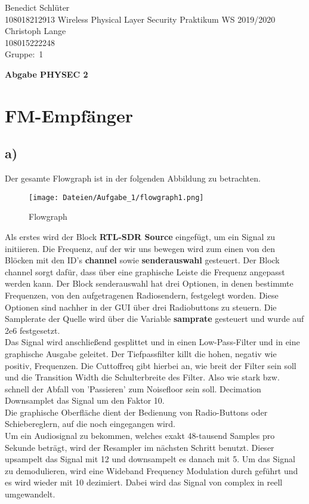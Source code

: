 \documentclass[12pt,a4paper]{article}
\newcommand{\student}{Benedict Schlüter\\ 108018212913 } %
\newcommand{\partner}{Christoph Lange\\ 108015222248} %
\newcommand{\group}{1} %
\newcommand{\hwheadtwo}{$ $
  \vspace{-2cm}
  
\noindent \student \qquad \qquad  Wireless Physical Layer Security Praktikum \hfill WS 2019/2020 \\
\noindent \partner \\
\noindent Gruppe:~\group\\
$ $

  
\begin{center}    
{\Large \bf Abgabe PHYSEC 2}
\end{center}
}
\begin{document}
\hwheadtwo
\section{FM-Empfänger}
\subsection*{a)}
Der gesamte Flowgraph ist in der folgenden Abbildung zu betrachten. 
\begin{figure}[H]
\centering
\texttt{[image: Dateien/Aufgabe\_1/flowgraph1.png]} 
\caption{Flowgraph}
\label{fig:1_1}
\end{figure}
Als erstes wird der Block \textbf{RTL-SDR Source} eingefügt, um ein Signal zu initiieren. Die Frequenz, auf der wir uns bewegen wird zum einen von den Blöcken mit den ID's \textbf{channel} sowie \textbf{senderauswahl} gesteuert. Der Block channel sorgt dafür, dass über eine graphische Leiste die Frequenz angepasst werden kann. Der Block senderauswahl hat drei Optionen, in denen bestimmte Frequenzen, von den aufgetragenen Radiosendern, festgelegt worden. Diese Optionen sind nachher in der GUI über drei Radiobuttons zu steuern. Die Samplerate der Quelle wird über die Variable \textbf{samprate} gesteuert und wurde auf 2e6 festgesetzt.\\
Das Signal wird anschließend gesplittet und in einen Low-Pass-Filter und in eine graphische Ausgabe geleitet. Der Tiefpassfilter killt die hohen, negativ wie positiv, Frequenzen. Die Cuttoffreq gibt hierbei an, wie breit der Filter sein soll und die Transition Width die Schulterbreite des Filter. Also wie stark bzw. schnell der Abfall von 'Passieren' zum Noisefloor sein soll. Decimation Downsamplet das Signal um den Faktor 10.\\ Die graphische Oberfläche dient der Bedienung von Radio-Buttons oder Schiebereglern, auf die noch eingegangen wird.\\
Um ein Audiosignal zu bekommen, welches exakt 48-tausend Samples pro Sekunde beträgt, wird der Resampler im nächsten Schritt benutzt. Dieser upsampelt das Signal mit 12 und downsampelt es danach mit 5. Um das Signal zu demodulieren, wird eine Wideband Frequency Modulation durch geführt und es wird wieder mit 10 dezimiert. Dabei wird das Signal von complex in reell umgewandelt.\\
\end{document}

